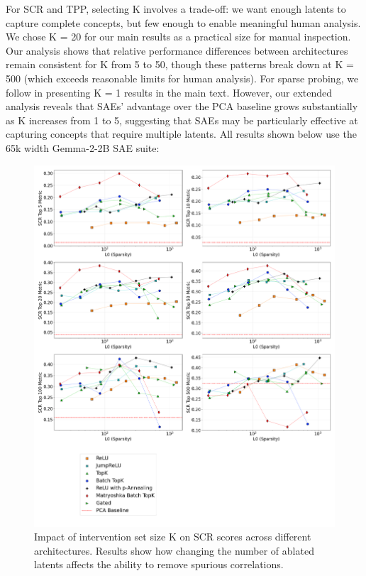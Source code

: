 \documentclass{article}
\theoremstyle{plain}
\theoremstyle{definition}
\theoremstyle{remark}
\begin{document}
For SCR and TPP, selecting K involves a trade-off: we want enough latents to capture complete concepts, but few enough to enable meaningful human analysis. We chose K = 20 for our main results as a practical size for manual inspection. Our analysis shows that relative performance differences between architectures remain consistent for K from 5 to 50, though these patterns break down at K = 500 (which exceeds reasonable limits for human analysis).
For sparse probing, we follow \citet{gao2024scaling} in presenting K = 1 results in the main text. However, our extended analysis reveals that SAEs' advantage over the PCA baseline grows substantially as K increases from 1 to 5, suggesting that SAEs may be particularly effective at capturing concepts that require multiple latents.
All results shown below use the 65k width Gemma-2-2B SAE suite:
\begin{figure}[h!]
\centering
\includegraphics[width=\columnwidth]{images/scr_tpp_sparse_probing_ks/plot_2x4_sae_bench_gemma-2-2b_65k_architecture_series_layer_12_scr.png}
\caption{Impact of intervention set size K on SCR scores across different architectures. Results show how changing the number of ablated latents affects the ability to remove spurious correlations.}
\end{figure}
\end{document}
